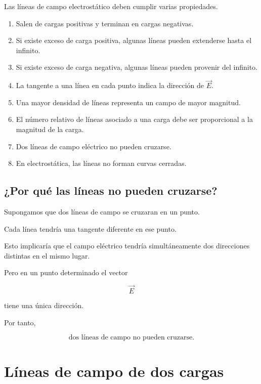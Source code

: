 Las líneas de campo electrostático deben cumplir varias propiedades.

\begin{enumerate}
    \item Salen de cargas positivas y terminan en cargas negativas.

    \item Si existe exceso de carga positiva, algunas líneas pueden extenderse hasta
    el infinito.

    \item Si existe exceso de carga negativa, algunas líneas pueden provenir del
    infinito.

    \item La tangente a una línea en cada punto indica la dirección de \(\vec E\).

    \item Una mayor densidad de líneas representa un campo de mayor magnitud.

    \item El número relativo de líneas asociado a una carga debe ser proporcional a
    la magnitud de la carga.

    \item Dos líneas de campo eléctrico no pueden cruzarse.

    \item En electrostática, las líneas no forman curvas cerradas.
\end{enumerate}


\subsection{¿Por qué las líneas no pueden cruzarse?}

Supongamos que dos líneas de campo se cruzaran en un punto.

Cada línea tendría una tangente diferente en ese punto.

Esto implicaría que el campo eléctrico tendría simultáneamente dos direcciones
distintas en el mismo lugar.

Pero en un punto determinado el vector

\[
\vec E
\]

tiene una única dirección.

Por tanto,

\[
\boxed{\text{dos líneas de campo no pueden cruzarse}}.
\]


\section{Líneas de campo de dos cargas}

